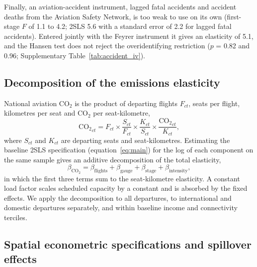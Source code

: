 \documentclass[12pt]{extarticle}
\begin{document}
Finally, an aviation-accident instrument, lagged fatal accidents and accident deaths from the Aviation Safety Network, is too weak to use on its own (first-stage $F$ of 1.1 to 4.2; 2SLS 5.6 with a standard error of 2.2 for lagged fatal accidents). Entered jointly with the Feyrer instrument it gives an elasticity of 5.1, and the Hansen test does not reject the overidentifying restriction ($p$ = 0.82 and 0.96; Supplementary Table~\ref{tab:accident_iv}).

\subsection*{Decomposition of the emissions elasticity}

National aviation CO$_2$ is the product of departing flights $F_{ct}$, seats per flight, kilometres per seat and CO$_2$ per seat-kilometre,
\begin{equation}
\mathrm{CO_2}_{ct} = F_{ct} \times \frac{S_{ct}}{F_{ct}} \times
\frac{K_{ct}}{S_{ct}} \times \frac{\mathrm{CO_2}_{ct}}{K_{ct}},
\label{eq:identity}
\end{equation}
where $S_{ct}$ and $K_{ct}$ are departing seats and seat-kilometres. Estimating the baseline 2SLS specification (equation~\ref{eq:main}) for the log of each component on the same sample gives an additive decomposition of the total elasticity,
\begin{equation}
\beta_{\mathrm{CO_2}} = \beta_{\mathrm{flights}} + \beta_{\mathrm{gauge}} +
\beta_{\mathrm{stage}} + \beta_{\mathrm{intensity}},
\label{eq:decomp}
\end{equation}
in which the first three terms sum to the seat-kilometre elasticity. A constant load factor scales scheduled capacity by a constant and is absorbed by the fixed effects. We apply the decomposition to all departures, to international and domestic departures separately, and within baseline income and connectivity terciles.

\subsection*{Spatial econometric specifications and spillover effects}
\end{document}
